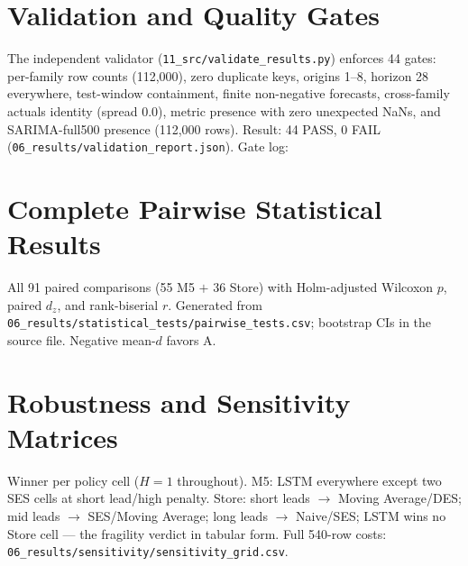 \section{Validation and Quality Gates}
\label{app:gates}
The independent validator (\texttt{11\_src/validate\_results.py}) enforces 44
gates: per-family row counts (112,000), zero duplicate keys, origins 1--8,
horizon 28 everywhere, test-window containment, finite non-negative forecasts,
cross-family actuals identity (spread 0.0), metric presence with zero
unexpected NaNs, and SARIMA-full500 presence (112,000 rows). Result: 44 PASS,
0 FAIL (\texttt{06\_results/validation\_report.json}). Gate log:
\begin{table}[H]
\centering
\caption{Validation gates (part 1).}

\end{table}
\begin{table}[H]
\centering
\caption{Validation gates (part 2).}

\end{table}

\section{Complete Pairwise Statistical Results}
\label{app:pairs}
All 91 paired comparisons (55 M5 $+$ 36 Store) with Holm-adjusted Wilcoxon
$p$, paired $d_z$, and rank-biserial $r$. Generated from
\texttt{06\_results/statistical\_tests/pairwise\_tests.csv}; bootstrap CIs in
the source file. Negative mean-$d$ favors A.
\begin{table}[H]
\centering
\caption{Pairwise results: M5 (part 1 of 2).}

\end{table}
\begin{table}[H]
\centering
\caption{Pairwise results: M5 (part 2 of 2).}

\end{table}
\begin{table}[H]
\centering
\caption{Pairwise results: Store (36 pairs).}

\end{table}

\section{Robustness and Sensitivity Matrices}
\label{app:sens}
Winner per policy cell ($H=1$ throughout). M5: LSTM everywhere except two SES
cells at short lead/high penalty. Store: short leads $\rightarrow$
Moving Average/DES; mid leads $\rightarrow$ SES/Moving Average; long leads
$\rightarrow$ Naive/SES; LSTM wins no Store cell --- the fragility verdict in
tabular form. Full 540-row costs:
\texttt{06\_results/sensitivity/sensitivity\_grid.csv}.
\begin{table}[H]
\centering
\caption{Policy winners: M5 (27 cells).}

\end{table}
\begin{table}[H]
\centering
\caption{Policy winners: Store (27 cells).}

\end{table}

